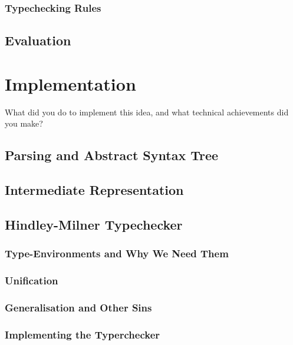 \documentclass{l4proj}
\begin{document}
\subsection{Typechecking Rules}
\section{Evaluation}

\chapter{Implementation}
What did you do to implement this idea, and what technical achievements did you make?
\section{Parsing and Abstract Syntax Tree}
\section{Intermediate Representation}
\section{Hindley-Milner Typechecker}



\subsection{Type-Environments and Why We Need Them}
\subsection{Unification}
\subsection{Generalisation and Other Sins}
\subsection{Implementing the Typerchecker}
\end{document}
